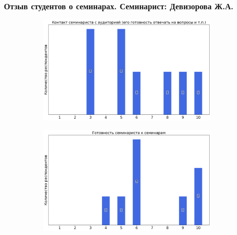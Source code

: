     \subsubsection{Отзыв студентов о семинарах. Семинарист: Девизорова Ж.А.}
        \begin{figure}[H]
            \centering
            \begin{subfigure}[b]{0.45\textwidth}
                \centering
                \includegraphics[width=\textwidth]{images/3 course/Теория поля/seminarists-marks-Девизорова Ж.А.-0.png}
            \end{subfigure}
            \begin{subfigure}[b]{0.45\textwidth}
                \centering
                \includegraphics[width=\textwidth]{images/3 course/Теория поля/seminarists-marks-Девизорова Ж.А.-1.png}
            \end{subfigure}
            \begin{subfigure}[b]{0.45\textwidth}
                \centering

\end{subfigure}
\end{figure}
